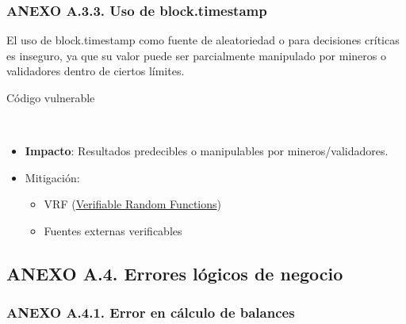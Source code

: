 \subsubsection{ANEXO A.3.3. Uso de
block.timestamp}\label{anexo-a.3.3.-uso-de-block.timestamp}

El uso de block.timestamp como fuente de aleatoriedad o para decisiones
críticas es inseguro, ya que su valor puede ser parcialmente manipulado
por mineros o validadores dentro de ciertos límites.

Código vulnerable

\begin{Shaded}
\begin{Highlighting}[]
 \NormalTok{() }

     \NormalTok{(}\NormalTok{)))}\OperatorTok{;}

\NormalTok{\}}
\end{Highlighting}
\end{Shaded}

\begin{itemize}
\tightlist
\item
  \textbf{Impacto}: Resultados predecibles o manipulables por
  mineros/validadores.
\item
  Mitigación:

  \begin{itemize}
  \tightlist
  \item
    VRF
    (\href{https://chain.link/education-hub/verifiable-random-function-vrf}{Verifiable
    Random Functions})
  \item
    Fuentes externas verificables
  \end{itemize}
\end{itemize}

\subsection{ANEXO A.4. Errores lógicos de
negocio}\label{anexo-a.4.-errores-luxf3gicos-de-negocio}

\subsubsection{ANEXO A.4.1. Error en cálculo de
balances}\label{anexo-a.4.1.-error-en-cuxe1lculo-de-balances}

